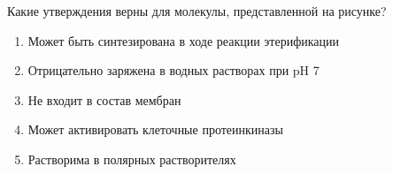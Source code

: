 
Какие утверждения верны для
молекулы, представленной на рисунке?


\begin{enumerate}
    \item Может быть синтезирована в ходе реакции этерификации
    \item Отрицательно заряжена в водных растворах при pH 7
    \item Не входит в состав мембран
    \item Может активировать клеточные протеинкиназы
    \item Растворима в полярных растворителях
\end{enumerate}

\explanationSection

